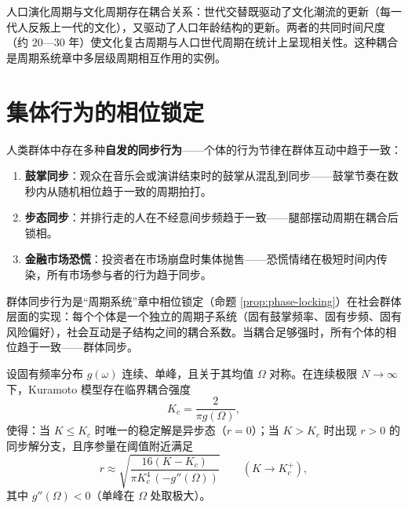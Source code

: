 \begin{remark}[人口周期与文化周期的耦合]
人口演化周期与文化周期存在耦合关系：世代交替既驱动了文化潮流的更新（每一代人反叛上一代的文化），又驱动了人口年龄结构的更新。两者的共同时间尺度（约 $20$—$30$ 年）使文化复古周期与人口世代周期在统计上呈现相关性。这种耦合是周期系统章中多层级周期相互作用的实例。
\end{remark}

\section{集体行为的相位锁定}

\begin{definition}[群体同步行为]\label{def:collective_synchrony}
人类群体中存在多种\textbf{自发的同步行为}——个体的行为节律在群体互动中趋于一致：
\begin{enumerate}[label=(\roman*)]
    \item \textbf{鼓掌同步}：观众在音乐会或演讲结束时的鼓掌从混乱到同步——鼓掌节奏在数秒内从随机相位趋于一致的周期拍打。
    \item \textbf{步态同步}：并排行走的人在不经意间步频趋于一致——腿部摆动周期在耦合后锁相。
    \item \textbf{金融市场恐慌}：投资者在市场崩盘时集体抛售——恐慌情绪在极短时间内传染，所有市场参与者的行为趋于同步。
\end{enumerate}
群体同步行为是“周期系统”章中相位锁定（命题 \ref{prop:phase-locking}）在社会群体层面的实现：每个个体是一个独立的周期子系统（固有鼓掌频率、固有步频、固有风险偏好），社会互动是子结构之间的耦合系数。当耦合足够强时，所有个体的相位趋于一致——群体同步。
\end{definition}

\begin{lemma}\label{ch27_kuramoto_threshold}
设固有频率分布 $g(\omega)$ 连续、单峰，且关于其均值 $\Omega$ 对称。在连续极限 $N\to\infty$ 下，Kuramoto 模型存在临界耦合强度
\[
K_c = \frac{2}{\pi g(\Omega)},
\]
使得：当 $K \le K_c$ 时唯一的稳定解是异步态（$r=0$）；当 $K > K_c$ 时出现 $r>0$ 的同步解分支，且序参量在阈值附近满足
\[
r \approx \sqrt{\frac{16(K-K_c)}{\pi K_c^4\,(-g''(\Omega))}} \qquad (K \to K_c^+),
\]
其中 $g''(\Omega) < 0$（单峰在 $\Omega$ 处取极大）。
\end{lemma}

